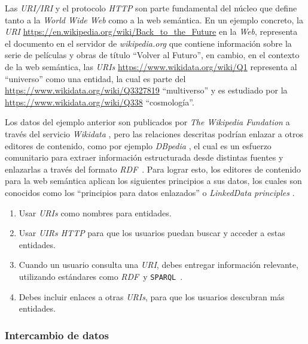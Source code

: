 \documentclass[conference,compsoc]{IEEEtran}
\newcommand{\rdf}{\textit{RDF}\ }
\newcommand{\spql}{\texttt{SPARQL}\ }
\begin{document}
Las \textit{URI/IRI} y el protocolo \textit{HTTP} son parte fundamental del núcleo que define tanto a la
\textit{World Wide Web} como a la web semántica. En un ejemplo concreto, la \textit{URI}
\url{https://en.wikipedia.org/wiki/Back_to_the_Future} en la \textit{Web}, representa el documento en el
servidor de \textit{wikipedia.org} que contiene información sobre la serie de películas y obras de título
``Volver al Futuro'', en cambio, en el contexto de la web semántica, las \textit{URIs} \url{https://www.wikidata.org/wiki/Q1} representa al
``universo'' como una entidad, la cual es parte del \url{https://www.wikidata.org/wiki/Q3327819} ``multiverso''
y es estudiado por la \url{https://www.wikidata.org/wiki/Q338} ``cosmología''.

Los datos del ejemplo anterior son publicados por \textit{The Wikipedia Fundation} a través del servicio \textit{Wikidata}
\cite{vrandevcic2014wikidata}, pero las relaciones descritas podrían enlazar a otros editores de contenido,
como por ejemplo \textit{DBpedia} \cite{valsecchi2015dbpedia}, el cual es un esfuerzo comunitario para extraer
información estructurada desde distintas fuentes y enlazarlas a través del formato \rdf. Para lograr esto,
los editores de contenido para la web semántica aplican los siguientes principios a sus datos, los cuales
son conocidos como los ``principios para datos enlazados'' o \textit{LinkedData principles} \cite{bizer2011linked}.

\begin{enumerate}
    \item Usar \textit{URIs} como nombres para entidades.
    \item Usar \textit{UIRs HTTP} para que los usuarios puedan buscar y acceder a estas entidades.
    \item Cuando un usuario consulta una \textit{URI}, debes entregar información relevante, utilizando estándares como \rdf y \spql.
    \item Debes incluir enlaces a otras \textit{URIs}, para que los usuarios descubran más entidades.
\end{enumerate}

    \subsubsection{Intercambio de datos}
\end{document}
